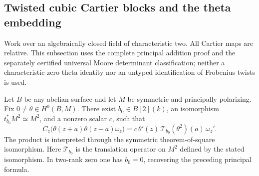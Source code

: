 \subsection{Twisted cubic Cartier blocks and the theta embedding}
\label{subsec:ppav-twisted-Cartier-Moore}

Work over an algebraically closed field of characteristic two.  All
Cartier maps are relative.  This subsection uses the complete principal
addition proof and the separately certified universal Moore determinant
classification; neither a characteristic-zero theta identity nor an
untyped identification of Frobenius twists is used.

\begin{lemma}
\label{lem:principal-theta-Cartier-translated-square}
Let \(B\) be any abelian surface and let \(M\) be symmetric and
principally polarizing.  Fix \(0\ne\theta\in H^0(B,M)\).
There exist \(b_0\in B[2](k)\), an isomorphism
\(t_{b_0}^*M^2\simeq M^2\), and a nonzero scalar \(c\), such that
\[
 C_z\bigl(\theta(z+a)\theta(z-a)\omega_z\bigr)
   =c\,\theta'(z)\,\mathcal T_{b_0}(\theta^2)(a)\,\omega_z'.
                                                        \tag{TCM1}
\]
The product is interpreted through the symmetric theorem-of-square
isomorphism.  Here \(\mathcal T_{b_0}\) is the translation operator
on \(M^2\) defined by the stated isomorphism.  In two-rank zero
one has \(b_0=0\), recovering the preceding principal formula.
\end{lemma}
